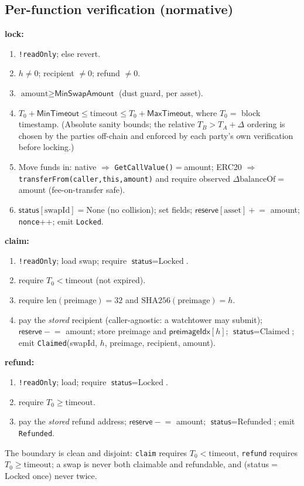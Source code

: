 \documentclass[11pt]{article}
\begin{document}
\subsection{Per-function verification (normative)}
\textbf{lock:}
\begin{enumerate}[noitemsep,leftmargin=2em]
  \item \texttt{!readOnly}; else revert.
  \item $h\neq 0$; recipient $\neq 0$; refund $\neq 0$.
  \item $\text{amount} \ge \textsf{MinSwapAmount}$ (dust guard, per asset).
  \item $T_{0}+\textsf{MinTimeout} \le \text{timeout} \le T_{0}+\textsf{MaxTimeout}$,
        where $T_0=$ block timestamp. (Absolute sanity bounds; the relative
        $T_B>T_A+\Delta$ ordering is chosen by the parties off-chain and
        enforced by each party's own verification before locking.)
  \item Move funds in: native $\Rightarrow$ \texttt{GetCallValue()}$=$amount;
        ERC20 $\Rightarrow$ \texttt{transferFrom(caller,this,amount)} and require
        observed $\Delta\mathrm{balanceOf}=$ amount (fee-on-transfer safe).
  \item $\textsf{status}[\text{swapId}]=\text{None}$ (no collision); set fields;
        $\textsf{reserve}[\text{asset}]\mathrel{+}=$ amount; \texttt{nonce}{+}{+};
        emit \texttt{Locked}.
\end{enumerate}
\textbf{claim:}
\begin{enumerate}[noitemsep,leftmargin=2em]
  \item \texttt{!readOnly}; load swap; require $\textsf{status}=\text{Locked}$.
  \item require $T_0 < \text{timeout}$ (not expired).
  \item require $\mathrm{len}(\text{preimage})=32$ and
        $\mathrm{SHA256}(\text{preimage})=h$.
  \item pay the \emph{stored} recipient (caller-agnostic: a watchtower may
        submit); $\textsf{reserve}\mathrel{-}=$ amount; store preimage and
        $\textsf{preimageIdx}[h]$; $\textsf{status}=\text{Claimed}$; emit
        \texttt{Claimed}(swapId, $h$, preimage, recipient, amount).
\end{enumerate}
\textbf{refund:}
\begin{enumerate}[noitemsep,leftmargin=2em]
  \item \texttt{!readOnly}; load; require $\textsf{status}=\text{Locked}$.
  \item require $T_0 \ge \text{timeout}$.
  \item pay the \emph{stored} refund address; $\textsf{reserve}\mathrel{-}=$
        amount; $\textsf{status}=\text{Refunded}$; emit \texttt{Refunded}.
\end{enumerate}
The boundary is clean and disjoint: \texttt{claim} requires
$T_0<\text{timeout}$, \texttt{refund} requires $T_0\ge\text{timeout}$; a swap is
never both claimable and refundable, and (status$=$Locked once) never twice.
\end{document}
